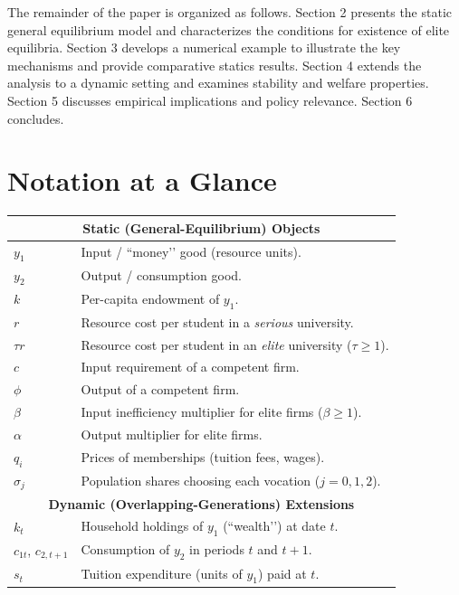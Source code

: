 \documentclass[12pt,letterpaper]{article}
\begin{document}
	The remainder of the paper is organized as follows. Section 2 presents the static general equilibrium model and characterizes the conditions for existence of elite equilibria. Section 3 develops a numerical example to illustrate the key mechanisms and provide comparative statics results. Section 4 extends the analysis to a dynamic setting and examines stability and welfare properties. Section 5 discusses empirical implications and policy relevance. Section 6 concludes.

	
	
	
\section{Notation at a Glance}\label{sec:notation}

\begin{table}[H]\centering
	\small
	\begin{tabular}{@{}p{2.8cm}p{10cm}@{}}
		\toprule
		\multicolumn{2}{c}{\textbf{Static (General-Equilibrium) Objects}}\\
		\midrule
		$y_1$ & Input / “money’’ good (resource units).\\
		$y_2$ & Output / consumption good.\\
		$k$ & Per-capita endowment of $y_1$.\\
		$r$ & Resource cost per student in a \emph{serious} university.\\
		$\tau r$ & Resource cost per student in an \emph{elite} university ($\tau\!\ge1$).\\
		$c$ & Input requirement of a competent firm.\\
		$\phi$ & Output of a competent firm.\\
		$\beta$ & Input inefficiency multiplier for elite firms ($\beta\!\ge1$).\\
		$\alpha$ & Output multiplier for elite firms.\\
		$q_i$ & Prices of memberships (tuition fees, wages).\\
		$\sigma_j$ & Population shares choosing each vocation ($j=0,1,2$).\\
		\midrule
		\multicolumn{2}{c}{\textbf{Dynamic (Overlapping-Generations) Extensions}}\\
		\midrule
		$k_t$ & Household holdings of $y_1$ (“wealth’’) at date $t$.\\
		$c_{1t}$, $c_{2,t+1}$ & Consumption of $y_2$ in periods $t$ and $t\!+\!1$.\\
		$s_t$ & Tuition expenditure (units of $y_1$) paid at $t$.\\

\end{tabular}
\end{table}
\end{document}
